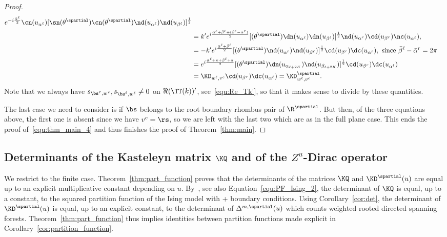 \documentclass[a4paper,twoside,11pt]{article}
\begin{document}
\begin{proof}
\begin{align*}
{e^{-i\frac{\bar{\alpha}^\ell}{2}}\cn(u_{\alpha^\ell})[\sn(\theta^\spartial)\cn(\theta^\spartial)\nd(u_{\alpha^\ell})\nd(u_{\beta^\ell})]^{\frac{1}{2}}}\\
&=k'e^{i\frac{\bar{\alpha}^\ell+\bar{\beta}^\ell+(\bar{\beta}^\ell-\bar{\alpha}^r)}{2}}
[\sc(\theta^\spartial)\dn(u_{\alpha^\ell})\dn(u_{\beta^\ell})]^{\frac{1}{2}}
\nd(u_{\alpha^r})\cd(u_{\beta^r})\nc(u_{\alpha^\ell}),\\
&=-k'e^{i\frac{\bar{\alpha}^\ell+\bar{\beta}^\ell}{2}}
[\sc(\theta^\spartial)\nd(u_{\alpha^\ell})\nd(u_{\beta^\ell})]^{\frac{1}{2}}\cd(u_{\beta^r})\dc(u_{\alpha^\ell}), 
\text{ since $\bar{\beta}^\ell-\bar{\alpha}^r=2\pi$}\\
&=e^{i\frac{\bar{\alpha}^\ell+\pi+\bar{\beta}^\ell+\pi}{2}}
[\sc(\theta^\spartial)\dn(u_{\alpha_{\ell+2K}})\nd(u_{\beta_{\ell+2K}})]^{\frac{1}{2}}\cd(u_{\beta^r})\dc(u_{\alpha^\ell})\\
&=\KD_{w^\ell,v^c} \cd(u_{\beta^r})\dc(u_{\alpha^\ell})=\KD^\spartial_{w^\ell,v^c}.
\end{align*}
Note that we always have $s_{\bs^r,w^r},s_{\bs^\ell,w^\ell}\neq 0$ on $\Re(\TT(k))'$, see~\eqref{equ:Re_Tk'},
so that it makes sense to divide by these quantities.

The last case we need to consider is if $\bs$ belongs to the root boundary rhombus pair of $\R^{\spartial}$.
But then, of the three equations above, the first one is absent since we have $v^c=\rs$, so we are left with the last two which are as in 
the full plane case. This ends the proof of~\eqref{equ:thm_main_4} and thus finishes the proof of Theorem~\ref{thm:main}.
\end{proof}



\subsection{Determinants of the Kasteleyn matrix $\KQ$ and of the $Z^u$-Dirac operator}\label{sec:det_KQ_KD}

We restrict to the finite case. Theorem~\ref{thm:part_function} proves that the determinants of the matrices $\KQ$ and $\KD^\spartial(u)$
are equal up to an explicit multiplicative constant depending on $u$. By~\cite{Dubedat}, see also Equation~\eqref{equ:PF_Ising_2}, the determinant 
of $\KQ$ is equal, up to a constant, to the squared partition function of the Ising model with + boundary conditions. Using Corollary~\ref{cor:det},
the determinant of $\KD^\spartial(u)$ is equal, up to an explicit constant, to the determinant of $\Delta^{m,\spartial}(u)$ which counts
weighted rooted directed spanning forests. Theorem~\ref{thm:part_function} thus implies identities between partition functions
made explicit in Corollary~\ref{cor:partition_function}.
\end{document}
